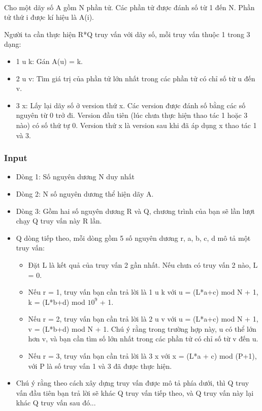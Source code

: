 

 

Cho một dãy số A gồm N phần tử. Các phần tử được đánh số từ 1 đến N. Phần tử thứ i được kí hiệu là A(i).

Người ta cần thực hiện R*Q truy vấn với dãy số, mỗi truy vấn thuộc 1 trong 3 dạng:
\begin{itemize}
	\item 1 u k: Gán A(u) = k.
	\item 2 u v: Tìm giá trị của phần tử lớn nhất trong các phần tử có chỉ số từ u đến v.
	\item 3 x: Lấy lại dãy số ở version thứ x. Các version được đánh số bằng các số nguyên từ 0 trở đi. Version đầu tiên (lúc chưa thực hiện thao tác 1 hoặc 3 nào) có số thứ tự 0. Version thứ x là version sau khi đã áp dụng x thao tác 1 và 3.
\end{itemize}

\subsubsection{Input}
\begin{itemize}
	\item Dòng 1: Số nguyên dương N duy nhất
	\item Dòng 2: N số nguyên dương thể hiện dãy A.
	\item Dòng 3: Gồm hai số nguyên dương R và Q, chương trình của bạn sẽ lần lượt chạy Q truy vấn này R lần.
	\item Q dòng tiếp theo, mỗi dòng gồm 5 số nguyên dương r, a, b, c, d mô tả một truy vấn:
\begin{itemize}
	\item Đặt L là kết quả của truy vấn 2 gần nhất. Nếu chưa có truy vấn 2 nào, L = 0.
	\item Nếu r = 1, truy vấn bạn cần trả lời là 1 u k với u = (L*a+c) mod N + 1, k = (L*b+d) mod $10^{9}$ + 1.
	\item Nếu r = 2, truy vấn bạn cần trả lời là 2 u v với u = (L*a+c) mod N + 1, v = (L*b+d) mod N + 1. Chú ý rằng trong trường hợp này, u có thể lớn hơn v, và bạn cần tìm số lớn nhất trong các phần tử có chỉ số từ v đến u.
	\item Nếu r = 3, truy vấn bạn cần trả lời là 3 x với x = (L*a + c) mod (P+1), với P là số truy vấn 1 và 3 đã được thực hiện.
\end{itemize}
	\item Chú ý rằng theo cách xây dựng truy vấn được mô tả phía dưới, thì Q truy vấn đầu tiên bạn trả lời sẽ khác Q truy vấn tiếp theo, và Q truy vấn này lại khác Q truy vấn sau đó...
\begin{itemize}
\end{itemize}
\end{itemize}

